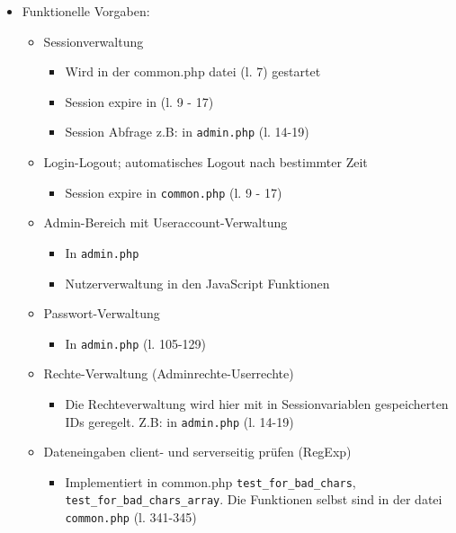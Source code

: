\documentclass{article}
\begin{document}
\begin{itemize}
    \item Funktionelle Vorgaben:
    \begin{itemize}
        \item Sessionverwaltung
            \begin{itemize}
                \item Wird in der common.php datei (l. 7) gestartet
                \item Session expire in (l.  9 - 17)
                \item Session Abfrage z.B: in \verb|admin.php| (l. 14-19)
            \end{itemize}
        \item Login-Logout; automatisches Logout nach bestimmter Zeit
            \begin{itemize}
                \item Session expire in \verb|common.php| (l.  9 - 17) 
            \end{itemize}
        \item Admin-Bereich mit Useraccount-Verwaltung
            \begin{itemize}
                \item In \verb|admin.php|
                \item Nutzerverwaltung in den JavaScript Funktionen 
            \end{itemize}
        \item Passwort-Verwaltung
            \begin{itemize}
                \item In \verb|admin.php| (l. 105-129)
            \end{itemize}
        \item Rechte-Verwaltung (Adminrechte-Userrechte)
            \begin{itemize}
                \item Die Rechteverwaltung wird hier mit in Sessionvariablen gespeicherten IDs 
                    geregelt. Z.B: in \verb|admin.php| (l. 14-19)
            \end{itemize}
        \item Dateneingaben client- und serverseitig prüfen (RegExp)
            \begin{itemize}
                \item Implementiert in common.php \verb|test_for_bad_chars|,\\
                    \verb|test_for_bad_chars_array|. 
                    Die Funktionen selbst sind in der datei \verb|common.php| (l. 341-345) 

\end{itemize}
\end{itemize}
\end{itemize}
\end{document}
